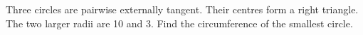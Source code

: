 Three circles are pairwise externally tangent. Their centres form a right triangle. The two larger radii are 10 and 3. Find the circumference of the smallest circle.
